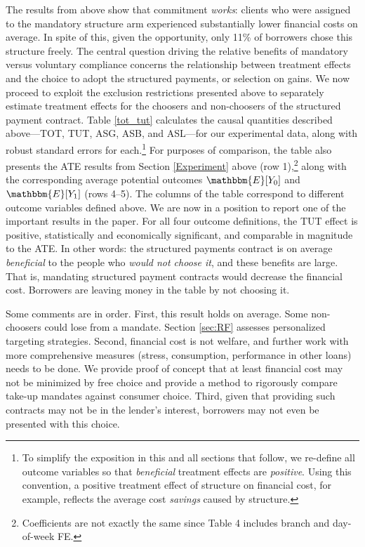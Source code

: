 \documentclass[12pt, a4paper, colorinlistoftodos]{article}
\begin{document}
The results from above show that commitment \emph{works}: clients who were assigned to the mandatory structure arm experienced substantially lower financial costs on average.  In spite of this, given the opportunity, only 11\% of borrowers chose this structure freely. The central question driving the relative benefits of mandatory versus voluntary compliance concerns the relationship between treatment effects and the choice to adopt the structured payments, or selection on gains.  We now proceed to exploit the exclusion restrictions presented above to separately estimate treatment effects for the choosers and non-choosers of the structured payment contract.  Table \ref{tot_tut} calculates the causal quantities described above---TOT, TUT, ASG, ASB, and ASL---for our experimental data, along with robust standard errors for each.\footnote{To simplify the exposition in this and all sections that follow, we re-define all outcome variables so that \emph{beneficial} treatment effects are \emph{positive}. Using this convention, a positive treatment effect of structure on financial cost, for example, reflects the average cost \emph{savings} caused by structure.} 
For purposes of comparison, the table also presents the ATE results from Section \ref{Experiment} above (row 1),\footnote{Coefficients are not exactly the same since Table 4 includes branch and day-of-week FE.} along with the corresponding average potential outcomes $\mathbbm{E}[Y_0]$ and $\mathbbm{E}[Y_1]$ (rows 4--5).
The columns of the table correspond to different outcome variables defined above.
We are now in a position to report one of the important results in the paper. For all four outcome definitions, the TUT effect is positive, statistically and economically significant, and comparable in magnitude to the ATE.
In other words: the structured payments contract is on average \emph{beneficial} to the people who \emph{would not choose it}, and these benefits are large. That is, mandating structured payment contracts would decrease the financial cost. Borrowers are leaving money in the table by not choosing it. 

Some comments are in order. First, this result holds on average. Some non-choosers could lose from a mandate. Section \ref{sec:RF} assesses personalized targeting strategies. Second, financial cost is not welfare, and further work with more comprehensive measures (stress, consumption, performance in other loans) needs to be done. We provide proof of concept that at least financial cost may not be minimized by free choice and provide a method to rigorously compare take-up mandates against consumer choice. Third, given that providing such contracts may not be in the lender's interest, borrowers may not even be presented with this choice.
\end{document}
